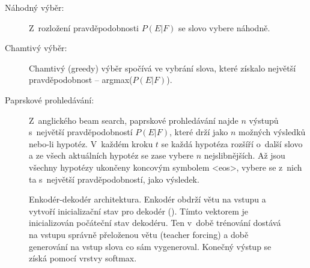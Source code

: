 \begin{description}
  \item[Náhodný výběr:] Z~rozložení pravděpodobnosti $P(E|F)$ se slovo vybere náhodně.
  \item[Chamtivý výběr:] Chamtivý (greedy) výběr spočívá ve vybrání slova, které získalo největší pravděpodobnost -- argmax($P(E|F)$).
  \item[Paprskové prohledávání:]\label{decsription:beamsearch} Z~anglického beam search, paprskové prohledávání najde $n$ výstupů s~největší pravděpodobností $P(E|F)$, které drží jako $n$ možných výsledků nebo-li hypotéz. V~každém kroku $t$ se každá hypotéza rozšíří o~další slovo a ze všech aktuálních hypotéz se zase vybere $n$ nejslibnějších. Až jsou všechny hypotézy ukončeny koncovým symbolem <eos>, vybere se z~nich ta s~největší pravděpodobností, jako výsledek.
\end{description}


\begin{figure}[H]
    \begin{center}
    \end{center}
	\caption{Enkodér-dekodér architektura. Enkodér obdrží větu na vstupu a vytvoří inicializační stav pro dekodér (). Tímto vektorem je inicializován počáteční stav dekodéru. Ten v~době trénování dostává na vstupu správně přeloženou větu (teacher forcing) a době generování na vstup slova co sám vygeneroval. Konečný výstup se získá pomocí vrstvy softmax.}
	\label{img:seq2seq}
\end{figure}

